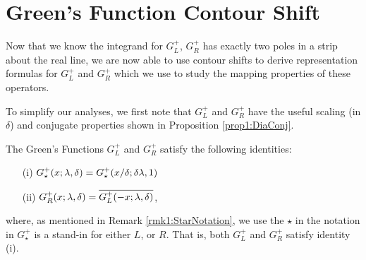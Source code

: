 \documentclass[../dissertation.tex]{subfiles}
\begin{document}
\section{Green's Function Contour Shift}\label{sec1:GreensFunctions}
Now that we know the integrand for $G_L^+$, $G_R^+$ has exactly two poles in 
a strip about the real line, we are now able to use
contour shifts to derive representation formulas for $G_L^+$ and $G_R^+$ which we use to study the 
mapping properties of these operators. 


To simplify our analyses, we first note that $G_L^+$ and $G_R^+$ have
the useful scaling (in $\delta$) and conjugate properties shown in 
Proposition \ref{prop1:DiaConj}.
\begin{prop}\label{prop1:DiaConj}
	The Green's Functions $G_L^+$ and $G_R^+$ satisfy the following
	identities:
	\begin{itemize}
		\item[(i)] $\displaystyle G_\star^+(x; \lambda, \delta) 
			= G_\star^+(x/\delta; \delta\lambda, 1)$
		\item[(ii)] $\displaystyle G_R^+(x; \lambda, \delta) = \overline{G_L^+(-x;\lambda, \delta)}$,
	\end{itemize}
	where, as mentioned in Remark \ref{rmk1:StarNotation}, we use the $\star$ in the 
	notation in $G_\star^+$ is a stand-in for either
	$L$, or $R$. That is, both $G_L^+$ and $G_R^+$ satisfy identity (i).
\end{prop}
\end{document}
